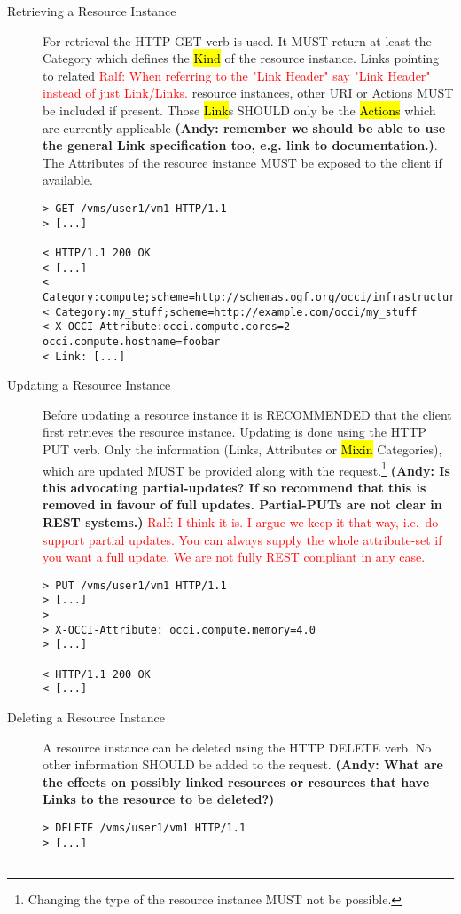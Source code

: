 \documentclass[10pt,a4paper]{article}
\newcommand{\ralf}[1]{\textcolor{red}{Ralf: #1}}
\begin{document}
\begin{description}
\item[Retrieving a Resource Instance] For retrieval the HTTP GET verb
  is used. It MUST return at least the Category which defines the
  \hl{Kind} of the resource instance. Links pointing to related
  \ralf{When referring to the "Link Header" say "Link Header" instead of just
  Link/Links.}
  resource instances, other URI or Actions MUST be included if
  present. Those \hl{Link}s SHOULD only be the
  \hl{Actions} which are currently applicable \textbf{(Andy: remember we should be able to use the 
  general Link specification too, e.g. link to documentation.)}. The Attributes of the 
  resource instance MUST be exposed to
  the client if available.
\begin{verbatim}
> GET /vms/user1/vm1 HTTP/1.1
> [...]
 
< HTTP/1.1 200 OK
< [...]
< Category:compute;scheme=http://schemas.ogf.org/occi/infrastructure
< Category:my_stuff;scheme=http://example.com/occi/my_stuff
< X-OCCI-Attribute:occi.compute.cores=2 occi.compute.hostname=foobar
< Link: [...]
\end{verbatim}

\item[Updating a Resource Instance] Before updating a resource
  instance it is RECOMMENDED that the client first retrieves the
  resource instance. Updating is done using the HTTP PUT verb. Only
  the information (Links, Attributes or \hl{Mixin} Categories), which
  are updated MUST be provided along with the
  request.\footnote{Changing the type of the resource instance MUST
    not be possible.} \textbf{(Andy: Is this advocating partial-updates? If so recommend 
    that this is removed in favour of full updates. Partial-PUTs are not clear in REST systems.)}
  \ralf{I think it is. I argue we keep it that way, i.e.~do support partial
  updates. You can always supply the whole attribute-set if you want a full
  update. We are not fully REST compliant in any case.}
\begin{verbatim}
> PUT /vms/user1/vm1 HTTP/1.1
> [...]
> 
> X-OCCI-Attribute: occi.compute.memory=4.0
> [...]
 
< HTTP/1.1 200 OK
< [...]
\end{verbatim}

\item[Deleting a Resource Instance] A resource instance can be deleted
  using the HTTP DELETE verb. No other information SHOULD be added to
  the request. \textbf{(Andy: What are the effects on possibly linked resources 
  or resources that have Links to the resource to be deleted?)}
\begin{verbatim}
> DELETE /vms/user1/vm1 HTTP/1.1
> [...]


\end{verbatim}
\end{description}
\end{document}
